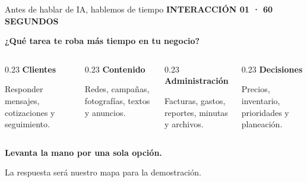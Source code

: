\documentclass[aspectratio=169,11pt]{beamer}
\newcommand{\kicker}[1]{{\color{gold}\scriptsize\bfseries\MakeUppercase{#1}}}
\newcommand{\muted}[1]{{\color{muted}#1}}
\newcommand{\ruleline}{\par\vspace{0.18cm}\noindent{\color{soft}\rule{\linewidth}{0.55pt}}\par\vspace{0.18cm}}
\begin{document}
\begin{frame}{Antes de hablar de IA, hablemos de tiempo}
\kicker{Interacción 01 · 60 segundos}
\vspace{0.35cm}

{\Large\bfseries ¿Qué tarea te roba más tiempo en tu negocio?}\par
\vspace{0.55cm}

\begin{columns}[T,onlytextwidth]
\begin{column}{0.23\textwidth}
\textbf{Clientes}\ruleline
\small Responder mensajes, cotizaciones y seguimiento.
\end{column}
\begin{column}{0.23\textwidth}
\textbf{Contenido}\ruleline
\small Redes, campañas, fotografías, textos y anuncios.
\end{column}
\begin{column}{0.23\textwidth}
\textbf{Administración}\ruleline
\small Facturas, gastos, reportes, minutas y archivos.
\end{column}
\begin{column}{0.23\textwidth}
\textbf{Decisiones}\ruleline
\small Precios, inventario, prioridades y planeación.
\end{column}
\end{columns}

\vfill
{\color{forest}\bfseries Levanta la mano por una sola opción.}\par\vspace{0.1cm}
\muted{La respuesta será nuestro mapa para la demostración.}
\end{frame}
\end{document}
